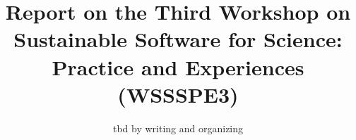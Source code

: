 \documentclass[11pt, oneside]{amsart}
\begin{document}
\title[]{Report on the Third Workshop on Sustainable Software for Science: Practice and Experiences (WSSSPE3)}

\author{tbd by writing and organizing}

 
\end{document}
